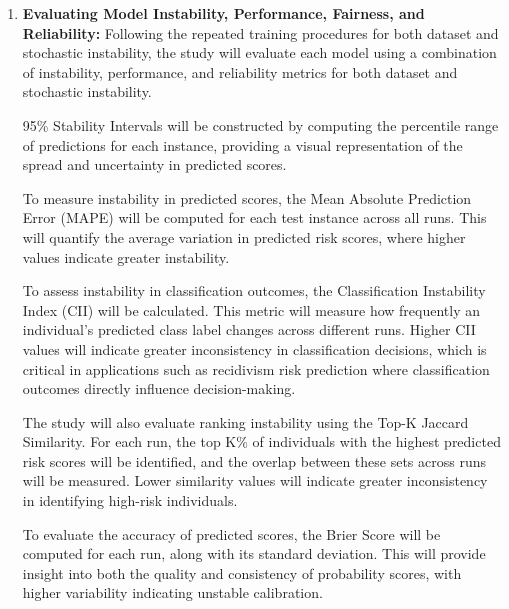 \documentclass[12pt]{article}
\begin{document}
\begin{enumerate}
  Similar to the dataset instability procedure, all predictions will be stored in structured CSV files, where each column will correspond to a specific training run with a distinct random seed. This format will enable direct comparison of predictions across runs at the individual level.\\

  By repeating this process across multiple random seeds, the study will generate a distribution of predictions for each test instance under stochastic conditions. These distributions will then be used in the later stages of the methodology.

  \item \textbf{Evaluating Model Instability, Performance, Fairness, and Reliability:}
  Following the repeated training procedures for both dataset and stochastic instability, the study will evaluate each model using a combination of instability, performance, and reliability metrics for both dataset and stochastic instability.

  95\% Stability Intervals will be constructed by computing the percentile range of predictions for each instance, providing a visual representation of the spread and uncertainty in predicted scores.

  To measure instability in predicted scores, the Mean Absolute Prediction Error (MAPE) will be computed for each test instance across all runs. This will quantify the average variation in predicted risk scores, where higher values indicate greater instability. 

  To assess instability in classification outcomes, the Classification Instability Index (CII) will be calculated. This metric will measure how frequently an individual's predicted class label changes across different runs. Higher CII values will indicate greater inconsistency in classification decisions, which is critical in applications such as recidivism risk prediction where classification outcomes directly influence decision-making. 

  The study will also evaluate ranking instability using the Top-K Jaccard Similarity. For each run, the top K\% of individuals with the highest predicted risk scores will be identified, and the overlap between these sets across runs will be measured. Lower similarity values will indicate greater inconsistency in identifying high-risk individuals.

  To evaluate the accuracy of predicted scores, the Brier Score will be computed for each run, along with its standard deviation. This will provide insight into both the quality and consistency of probability scores, with higher variability indicating unstable calibration.


\end{enumerate}
\end{document}
